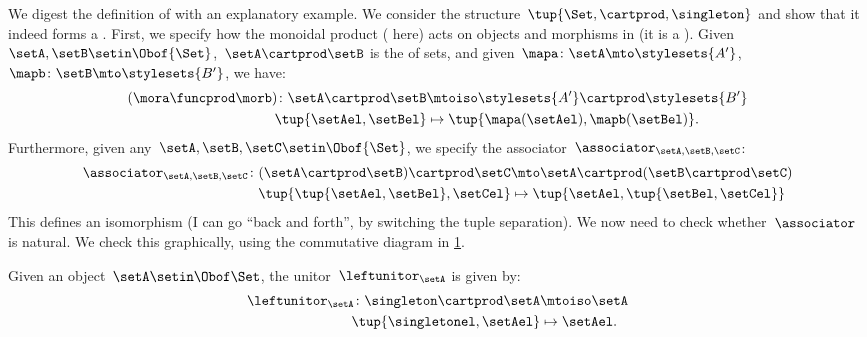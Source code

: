 \begin{example}
    We digest the definition of  with an explanatory example.
    We consider the structure~$\tup{\Set,\cartprod,\singleton}$ and show that it indeed forms a .
    First, we specify how the monoidal product ( here) acts on objects and morphisms in \Set (it is a ).
    Given~$\setA,\setB\setin \Obof{\Set}$,~$\setA\cartprod \setB$ is the  of sets, and given~$\mapa\colon \setA\mto \stylesets{A'}$,~$\mapb\colon \setB\mto \stylesets{B'}$, we have:
    \begin{equation}
        \label{eq:set_mon_prod_2}
        \begin{aligned}
            (\mora \funcprod \morb)
            \colon \setA\cartprod \setB & \mtoiso \stylesets{A'}\cartprod \stylesets{B'} \\
            \tup{\setAel,\setBel}       & \mapsto \tup{\mapa(\setAel),\mapb(\setBel)}.
        \end{aligned}
    \end{equation}
    Furthermore, given any~$\setA,\setB,\setC\setin \Obof{\Set}$, we specify the associator~$\associator_{\setA,\setB,\setC}$:
    \begin{equation}
        \label{eq:set_mon_prod_3}
        \begin{aligned}
            \associator_{\setA,\setB,\setC}\colon (\setA\cartprod \setB)\cartprod \setC & \mto \setA\cartprod (\setB\cartprod \setC) \\
            \tup{\tup{\setAel,\setBel},\setCel}                                         & \mapsto \tup{\setAel, \tup{\setBel,\setCel}}
        \end{aligned}
    \end{equation}
    This defines an isomorphism (I can go ``back and forth'', by switching the tuple separation).
    We now need to check whether~$\associator$ is natural.
    We check this graphically, using the commutative diagram in \cref{fig:monoidal_set_ass_nat}.

    \begin{figure}[h!]
        \centering
        \caption{}
        \label{fig:monoidal_set_ass_nat}
    \end{figure}

    Given an object~$\setA\setin \Obof\Set$, the unitor~$\leftunitor_\setA$ is given by:
    \begin{equation}
        \label{eq:set_mon_prod_4}
        \begin{aligned}
            \leftunitor_\setA\colon \singleton \cartprod \setA & \mtoiso \setA \\
            \tup{\singletonel,\setAel}                         & \mapsto \setAel.
        \end{aligned}
    \end{equation}


\end{example}
